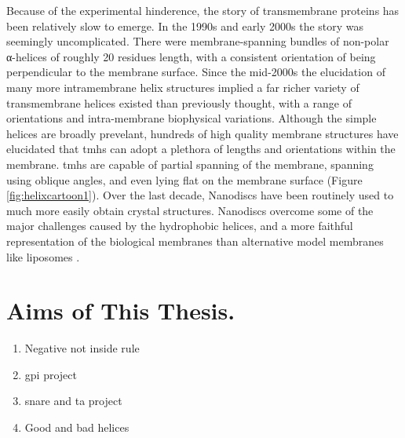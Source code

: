 Because of the experimental hinderence, the story of transmembrane proteins has been relatively slow to emerge. In the 1990s and early 2000s the story was seemingly uncomplicated. There were membrane-spanning bundles of non-polar α-helices of roughly 20 residues length, with a consistent orientation of being perpendicular to the membrane surface. Since the mid-2000s the elucidation of many more intramembrane helix structures implied a far richer variety of transmembrane helices existed than previously thought, with a range of orientations and intra-membrane biophysical variations. Although the simple helices are broadly prevelant, hundreds of high quality membrane structures have elucidated that \gls{tmh}s can adopt a plethora of lengths and orientations within the membrane. \gls{tmh}s are capable of partial spanning of the membrane, spanning using oblique angles, and even lying flat on the membrane surface \cite{VonHeijne2006, Elofsson2007} (Figure \ref{fig:helixcartoon1}). Over the last decade, Nanodiscs have been routinely used to much more easily obtain crystal structures. Nanodiscs overcome some of the major challenges caused by the hydrophobic helices, and a more faithful representation of the biological membranes than alternative model membranes like liposomes \cite{Borch2009}. %


\section{Aims of This Thesis.}

\begin{enumerate}
  \item Negative not inside rule
  \item \gls{gpi} project
  \item \gls{snare} and \gls{ta} project
  \item Good and bad helices
\end{enumerate}
